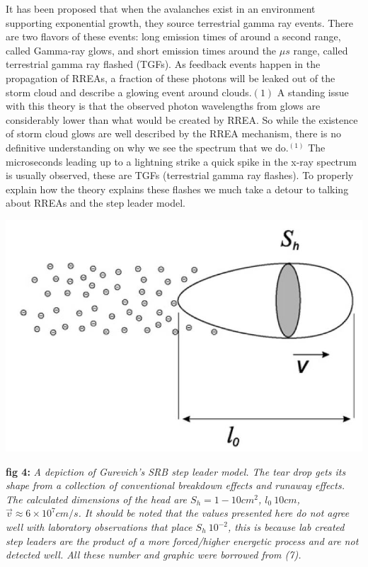 \documentclass[11pt]{article}
\begin{document}
\begin{multicols*}{2}
    It has been proposed that when the avalanches exist in an environment supporting exponential growth, they source terrestrial gamma ray events. There are two flavors of these events: long emission times of around a second range, called Gamma-ray glows, and short emission times around the $\mu s$ range, called terrestrial gamma ray flashed (TGFs). As feedback events happen in the propagation of RREAs, a fraction of these photons will be leaked out of the storm cloud and describe a glowing event around clouds.${(1)}$ A standing issue with this theory is that the observed photon wavelengths from glows are considerably lower than what would be created by RREA. So while the existence of storm cloud glows are well described by the RREA mechanism, there is no definitive understanding on why we see the spectrum that we do.$^{(1)}$ The microseconds leading up to a lightning strike a quick spike in the x-ray spectrum is usually observed, these are TGFs (terrestrial gamma ray flashes). To properly explain how the theory explains these flashes we much take a detour to talking about RREAs and the step leader model.
    
    \begin{center}
        \includegraphics[width=\linewidth]{images/step leader.JPG}
    \end{center}
    \textbf{fig 4:} \textit{A depiction of Gurevich's SRB step leader model. The tear drop gets its shape from a collection of conventional breakdown effects and runaway effects. The calculated dimensions of the head are $S_h = 1-10 cm^2$, $l_0 ~ 10 cm$, $\Vec{v} \approx 6 \times 10^7 cm/s$. It should be noted that the values presented here do not agree well with laboratory observations that place $S_h ~ 10^{-2}$, this is because lab created step leaders are the product of a more forced/higher energetic process and are not detected well. All these number and graphic were borrowed from (7).}
    

\end{multicols*}
\end{document}
